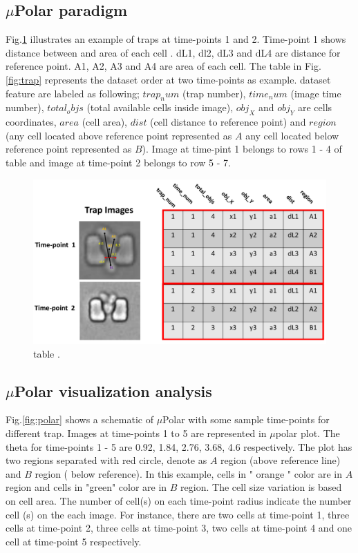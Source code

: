 \documentclass[conference]{IEEEtran}
\begin{document}
\subsection{$\mu$Polar paradigm}
Fig.\ref{fig:table} illustrates an example of traps at time-points 1 and 2. Time-point 1 shows distance between and area of each cell . dL1, dl2, dL3 and dL4 are distance for reference point. A1, A2, A3 and A4 are area of each cell. The table in Fig.\ref{fig:trap} represents the dataset order at two time-points as example. dataset feature are labeled as following; $trap_num $ (trap number), $ time_num $ (image time number), $ total_objs $ (total available cells inside image), $ obj_X $ and $ obj_Y $ are cells coordinates, $ area $ (cell area), $ dist $ (cell distance to reference point) and $ region $ (any cell located above reference point represented as $ A $ any cell located below reference point represented as $ B $). Image at time-pint 1 belongs to rows 1 - 4 of table and image at time-point 2 belongs to row 5 - 7. 

\begin{figure}
\centering
\includegraphics[width=\textwidth,height=10 cm]{Patterns/table.pdf}
\caption{ table .}
\label{fig:table}
\end{figure}

\subsection{$\mu$Polar visualization analysis}

Fig.\ref{fig:polar} shows a schematic of $\mu$Polar with some sample time-points for different trap. Images at time-points 1 to 5 are represented in $\mu$polar plot. The theta for time-points 1 - 5 are 0.92, 1.84, 2.76, 3.68, 4.6 respectively. The plot has two regions separated with red circle, denote as $ A $ region (above reference line) and $ B $ region ( below reference). In this example, cells in " orange " color are in $ A $  region and cells in "green" color are in $ B $ region. The cell size variation is based on cell area. The number of cell(s) on each time-point radius indicate the number cell (s) on the each image. For instance, there are two cells at time-point 1, three cells at time-point 2, three cells at time-point 3, two cells at time-point 4 and one cell at time-point 5 respectively. 
\end{document}
